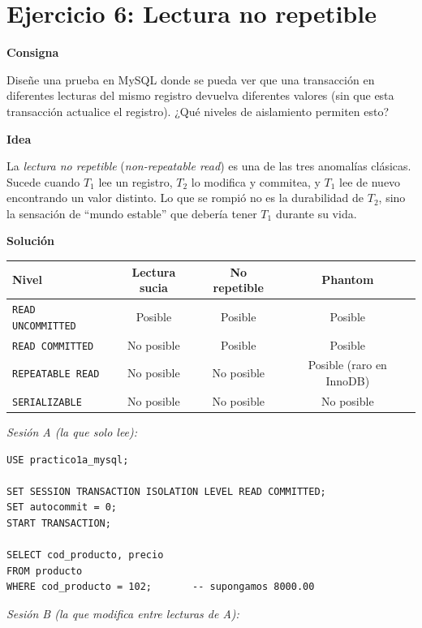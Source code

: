 \documentclass[11pt,a4paper]{article}
\newcommand{\itemcabecera}[1]{\noindent\textbf{#1}\par\medskip}
\newcommand{\bloqueConsigna}{\itemcabecera{Consigna}}
\newcommand{\bloqueIdea}{\itemcabecera{Idea}}
\newcommand{\bloqueSolucion}{\itemcabecera{Soluci\'on}}
\begin{document}
\section{Ejercicio 6: Lectura no repetible}

\bloqueConsigna

Diseñe una prueba en MySQL donde se pueda ver que una transacción en diferentes lecturas del mismo registro devuelva diferentes valores (sin que esta transacción actualice el registro). ¿Qué niveles de aislamiento permiten esto?

\bloqueIdea

La \emph{lectura no repetible} (\emph{non-repeatable read}) es una de las tres anomalías clásicas. Sucede cuando $T_1$ lee un registro, $T_2$ lo modifica y commitea, y $T_1$ lee de nuevo encontrando un valor distinto. Lo que se rompió no es la durabilidad de $T_2$, sino la sensación de ``mundo estable'' que debería tener $T_1$ durante su vida.

\bloqueSolucion

\begin{center}
\begin{tabular}{lccc}
\toprule
Nivel & Lectura sucia & No repetible & Phantom \\
\midrule
\texttt{READ UNCOMMITTED} & Posible    & Posible    & Posible \\
\texttt{READ COMMITTED}   & No posible & Posible    & Posible \\
\texttt{REPEATABLE READ}  & No posible & No posible & Posible (raro en InnoDB) \\
\texttt{SERIALIZABLE}     & No posible & No posible & No posible \\
\bottomrule
\end{tabular}
\end{center}

\textit{Sesión A (la que solo lee):}

\begin{lstlisting}
USE practico1a_mysql;

SET SESSION TRANSACTION ISOLATION LEVEL READ COMMITTED;
SET autocommit = 0;
START TRANSACTION;

SELECT cod_producto, precio
FROM producto
WHERE cod_producto = 102;       -- supongamos 8000.00
\end{lstlisting}

\textit{Sesión B (la que modifica entre lecturas de A):}
\end{document}
